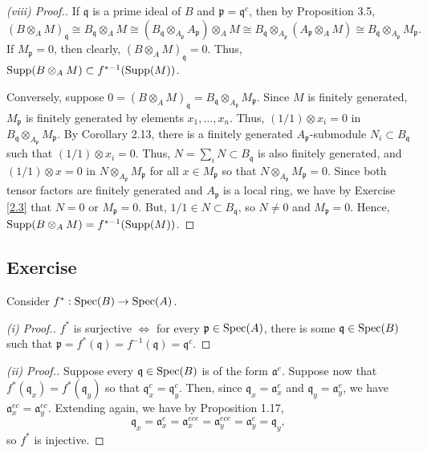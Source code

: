 \begin{proof}[(viii) Proof.]
If $\mathfrak{q}$ is a prime ideal of $B$ and $\mathfrak{p} = \mathfrak{q}^c$, then by Proposition 3.5,
$$(B \otimes_A M)_{\mathfrak{q}} \cong B_{\mathfrak{q}} \otimes_A M \cong (B_{\mathfrak{q}} \otimes_{A_{\mathfrak{p}}} A_{\mathfrak{p}}) \otimes_A M
\cong B_{\mathfrak{q}} \otimes_{A_{\mathfrak{p}}} (A_{\mathfrak{p}} \otimes_A M) \cong B_{\mathfrak{q}} \otimes_{A_{\mathfrak{p}}} M_{\mathfrak{p}}.$$
If $M_{\mathfrak{p}} = 0$, then clearly, $(B \otimes_A M)_{\mathfrak{q}} = 0$. Thus, $\operatorname{Supp}(B \otimes_A M) \subset f^{*-1}(\operatorname{Supp}(M))$.

Conversely, suppose $0 = (B \otimes_A M)_{\mathfrak{q}} = B_{\mathfrak{q}} \otimes_{A_{\mathfrak{p}}} M_{\mathfrak{p}}$. Since $M$ is finitely generated, $M_{\mathfrak{p}}$ is finitely generated
by elements $x_1,\ldots,x_n$. Thus, $(1/1) \otimes x_i = 0$ in $B_{\mathfrak{q}} \otimes_{A_{\mathfrak{p}}} M_{\mathfrak{p}}$. By Corollary 2.13, there is a finitely generated $A_{\mathfrak{p}}$-submodule 
$N_i \subset B_{\mathfrak{q}}$ such that $(1/1) \otimes x_i = 0$. Thus, $N = \sum_i N \subset B_{\mathfrak{q}}$ is also finitely generated, and $(1/1) \otimes x = 0$ in $N \otimes_{A_{\mathfrak{p}}} M_{\mathfrak{p}}$
for all $x \in M_{\mathfrak{p}}$ so that $N \otimes_{A_{\mathfrak{p}}} M_{\mathfrak{p}} = 0$. Since both tensor factors are finitely generated and $A_{\mathfrak{p}}$ is a local ring, we have by Exercise \ref{2.3} that
$N = 0$ or $M_{\mathfrak{p}} = 0$. But, $1/1 \in N \subset B_{\mathfrak{q}}$, so $N \neq 0$ and $M_{\mathfrak{p}} = 0$. Hence, $\operatorname{Supp}(B \otimes_A M) = f^{*-1}(\operatorname{Supp}(M))$.
\end{proof}

\subsection{Exercise}\label{3.20}

Consider $f^* : \operatorname{Spec}(B) \to \operatorname{Spec}(A)$. 
\begin{proof}[(i) Proof.]
$f^*$ is surjective $\iff$ for every $\mathfrak{p} \in \operatorname{Spec}(A)$, there is some $\mathfrak{q} \in \operatorname{Spec}(B)$ such
that $\mathfrak{p} = f^*(\mathfrak{q}) = f^{-1}(\mathfrak{q}) = \mathfrak{q}^c$.
\end{proof}

\begin{proof}[(ii) Proof.]
Suppose every $\mathfrak{q} \in \operatorname{Spec}(B)$ is of the form $\mathfrak{a}^e$. Suppose now that $f^*(\mathfrak{q}_x) = f^*(\mathfrak{q}_y)$ so that $\mathfrak{q}_x^c = \mathfrak{q}_y^c$. Then,
since $\mathfrak{q}_x =\mathfrak{a}_x^e$ and $\mathfrak{q}_y =\mathfrak{a}_y^e$, we have $\mathfrak{a}_x^{ec} = \mathfrak{a}_y^{ec}$. Extending again, we have by Proposition 1.17,
$$\mathfrak{q}_x = \mathfrak{a}_x^e = \mathfrak{a}_x^{ece} = \mathfrak{a}_y^{ece} = \mathfrak{a}_y^e = \mathfrak{q}_y,$$
so $f^*$ is injective.
\end{proof}

